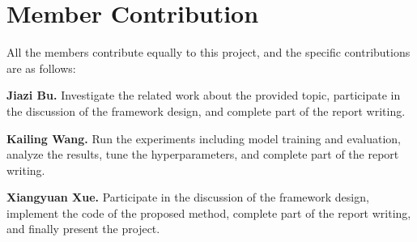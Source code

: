 \appendix

\section{Member Contribution}
\label{app:member_contribution}

All the members contribute equally to this project, and the specific contributions are as follows:

\noindent \textbf{Jiazi Bu.} Investigate the related work about the provided topic, participate in the discussion of the framework design, and complete part of the report writing.

\noindent \textbf{Kailing Wang.} Run the experiments including model training and evaluation, analyze the results, tune the hyperparameters, and complete part of the report writing.

\noindent \textbf{Xiangyuan Xue.} Participate in the discussion of the framework design, implement the code of the proposed method, complete part of the report writing, and finally present the project.